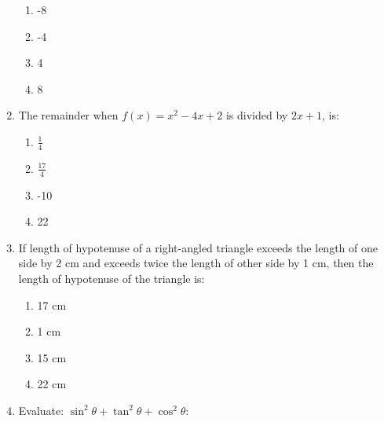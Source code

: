 \begin{enumerate}[label=(\roman*)]
        \begin{multicols}{2}
        \begin{enumerate}[label=(\alph*)]
            \item -8 
            \item -4 
            \item 4 
            \item 8 
        \end{enumerate}
        \end{multicols}

    \item The remainder when $f(x) = x^2 - 4x + 2$ is divided by $2x+1$, is: 

        \begin{multicols}{2}
        \begin{enumerate}[label=(\alph*)]
            \item $\frac{1}{4}$ 
            \item $\frac{17}{4}$ 
            \item -10
            \item 22
        \end{enumerate}
        \end{multicols}

    \item If length of hypotenuse of a right-angled triangle exceeds the length 
        of one side by 2 cm and exceeds twice the length of other side by 1 cm,
        then the length of hypotenuse of the triangle is:

        \begin{multicols}{2}
        \begin{enumerate}[label=(\alph*)]
            \item 17 cm
            \item 1 cm
            \item 15 cm
            \item 22 cm
        \end{enumerate}
        \end{multicols}

    \item Evaluate: $\sin^2 \theta + \tan^2 \theta + \cos^2 \theta$:


\end{enumerate}
